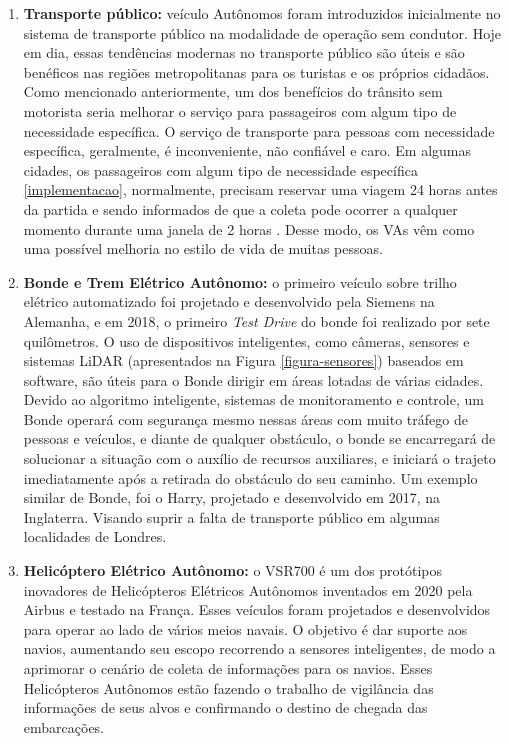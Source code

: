 \begin{enumerate}
\item \textbf{Transporte público:} veículo Autônomos foram introduzidos inicialmente no sistema de transporte público na modalidade de operação sem condutor. Hoje em dia, essas tendências modernas no transporte público são úteis e são benéficos nas regiões metropolitanas para os turistas e os próprios cidadãos. Como mencionado anteriormente, um dos benefícios do trânsito sem motorista seria melhorar o serviço para passageiros com algum tipo de necessidade específica. O serviço de transporte para pessoas com necessidade específica, geralmente, é inconveniente, não confiável e caro. Em algumas cidades, os passageiros com algum tipo de necessidade específica \ref{implementacao}, normalmente, precisam reservar uma viagem 24 horas antes da partida e sendo informados de que a coleta pode ocorrer a qualquer momento durante uma janela de 2 horas \cite{notif}. Desse modo, os VAs vêm como uma possível melhoria no estilo de vida de muitas pessoas.
\item \textbf{Bonde e Trem Elétrico Autônomo:} o primeiro veículo sobre trilho elétrico automatizado foi projetado e desenvolvido pela Siemens na Alemanha, e em 2018, o primeiro \textit{Test Drive} do bonde foi realizado por sete quilômetros. O uso de dispositivos inteligentes, como câmeras, sensores e sistemas LiDAR (apresentados na Figura \ref{figura-sensores}) baseados em software, são úteis para o Bonde dirigir em áreas lotadas de várias cidades. Devido ao algoritmo inteligente, sistemas de monitoramento e controle, um Bonde operará com segurança mesmo nessas áreas com muito tráfego de pessoas e veículos, e diante de qualquer obstáculo, o bonde se encarregará de solucionar a situação com o auxílio de recursos auxiliares, e iniciará o trajeto imediatamente após a retirada do obstáculo do seu caminho. Um exemplo similar de Bonde, foi o Harry, projetado e desenvolvido em 2017, na Inglaterra. Visando suprir a falta de transporte público em algumas localidades de Londres.
\item \textbf{Helicóptero Elétrico Autônomo:} o VSR700 é um dos protótipos inovadores de Helicópteros Elétricos Autônomos inventados em 2020 pela Airbus e testado na França. Esses veículos foram projetados e desenvolvidos para operar ao lado de vários meios navais. O objetivo é dar suporte aos navios, aumentando seu escopo recorrendo a sensores inteligentes, de modo a aprimorar o cenário de coleta de informações para os navios. Esses Helicópteros Autônomos estão fazendo o trabalho de vigilância das informações de seus alvos e confirmando o destino de chegada das embarcações.

\end{enumerate}
